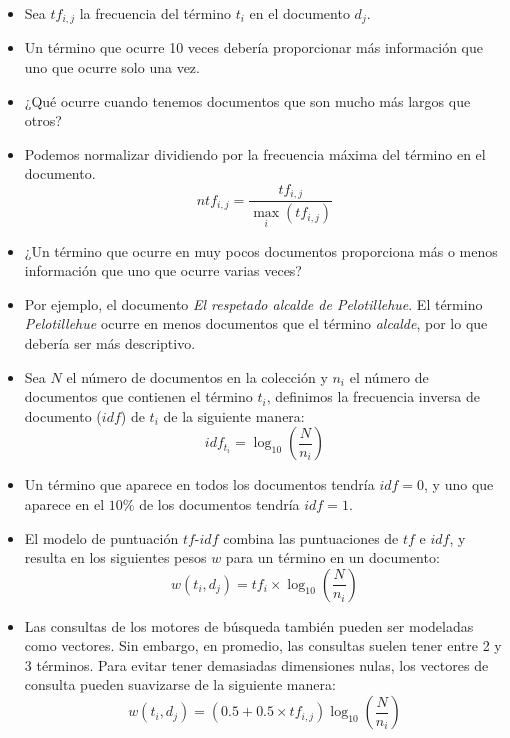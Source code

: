 \documentclass{book}
\begin{document}
\begin{itemize}
\item Sea $tf_{i,j}$ la frecuencia del término $t_{i}$ en el documento $d_{j}$.
\item Un término que ocurre 10 veces debería proporcionar más información que uno que ocurre solo una vez.
\item ¿Qué ocurre cuando tenemos documentos que son mucho más largos que otros?
\item Podemos normalizar dividiendo por la frecuencia máxima del término en el documento.
\begin{displaymath}
ntf_{i,j}=\frac{tf_{i,j}}{\max_i (tf_{i,j})}
\end{displaymath}
\item ¿Un término que ocurre en muy pocos documentos proporciona más o menos información que uno que ocurre varias veces?
\item Por ejemplo, el documento \emph{El respetado alcalde de Pelotillehue}. El término \emph{Pelotillehue} ocurre en menos documentos que el término \emph{alcalde}, por lo que debería ser más descriptivo.
\item Sea $N$ el número de documentos en la colección y $n_{i}$ el número de documentos que contienen el término $t_{i}$, definimos la frecuencia inversa de documento ($idf$) de $t_{i}$ de la siguiente manera:
\begin{displaymath}
idf_{t_{i}}= \log_{10}\left(\frac{N}{n_{i}}\right)
\end{displaymath}
\item Un término que aparece en todos los documentos tendría $idf=0$, y uno que aparece en el $10\%$ de los documentos tendría $idf=1$.
\item El modelo de puntuación $tf$-$idf$ combina las puntuaciones de $tf$ e $idf$, y resulta en los siguientes pesos $w$ para un término en un documento:
\begin{displaymath}
w(t_{i},d_{j})=tf_{i}\times \log_{10}\left(\frac{N}{n_{i}}\right)
\end{displaymath}
\item Las consultas de los motores de búsqueda también pueden ser modeladas como vectores. Sin embargo, en promedio, las consultas suelen tener entre 2 y 3 términos. Para evitar tener demasiadas dimensiones nulas, los vectores de consulta pueden suavizarse de la siguiente manera:
\begin{displaymath}
w(t_{i},d_{j})=(0.5+0.5\times tf_{i,j})\log_{10}\left(\frac{N}{n_{i}}\right)
\end{displaymath}
\end{itemize}
\end{document}
